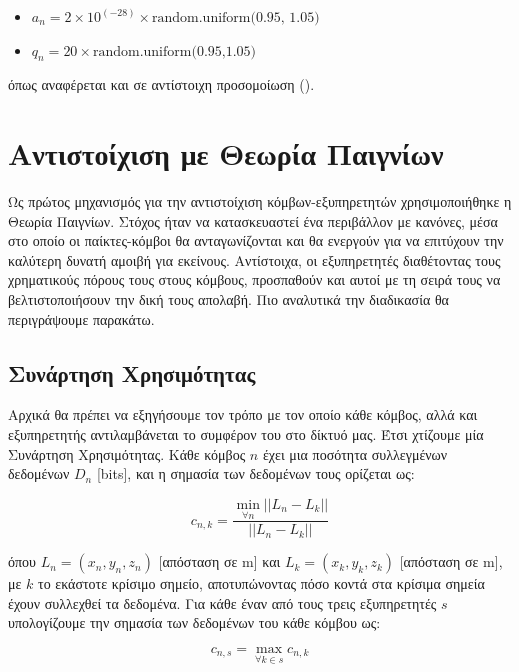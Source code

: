 \begin{itemize}
    \item $a_n = 2 \times 10^{(-28)} \times \text{random.uniform(0.95, 1.05)}$
    \item $q_n = 20 \times \text{random.uniform(0.95,1.05)}$
\end{itemize}

\noindent όπως αναφέρεται και σε αντίστοιχη προσομοίωση ().

\section{Αντιστοίχιση με Θεωρία Παιγνίων}

Ως πρώτος μηχανισμός για την αντιστοίχιση κόμβων-εξυπηρετητών χρησιμοποιήθηκε η Θεωρία Παιγνίων. Στόχος ήταν να κατασκευαστεί ένα περιβάλλον με κανόνες, μέσα στο οποίο οι παίκτες-κόμβοι θα ανταγωνίζονται και θα ενεργούν για να επιτύχουν την καλύτερη δυνατή αμοιβή για εκείνους. Αντίστοιχα, οι εξυπηρετητές διαθέτοντας τους χρηματικούς πόρους τους στους κόμβους, προσπαθούν και αυτοί με τη σειρά τους να βελτιστοποιήσουν την δική τους απολαβή. Πιο αναλυτικά την διαδικασία θα περιγράψουμε παρακάτω.

\subsection{Συνάρτηση Χρησιμότητας}

Αρχικά θα πρέπει να εξηγήσουμε τον τρόπο με τον οποίο κάθε κόμβος, αλλά και εξυπηρετητής αντιλαμβάνεται το συμφέρον του στο δίκτυό μας. Έτσι χτίζουμε μία Συνάρτηση Χρησιμότητας. Κάθε κόμβος $n$ έχει μια ποσότητα συλλεγμένων δεδομένων $D_n$ [bits], και η σημασία των δεδομένων τους ορίζεται ως:

\vspace{-5pt}

\begin{equation}
c_{n,k}=\frac{\min\limits_{\forall n} ||L_n-L_k||}{||L_n-L_k||}
\label{eq1}
\end{equation}

\noindent
όπου $L_n = (x_n,y_n,z_n)$ [απόσταση σε m] και $L_k = (x_k,y_k,z_k)$ [απόσταση σε m], με $k$ το εκάστοτε κρίσιμο σημείο, αποτυπώνοντας πόσο κοντά στα κρίσιμα σημεία έχουν συλλεχθεί τα δεδομένα. Για κάθε έναν από τους τρεις εξυπηρετητές $s$ υπολογίζουμε την σημασία των δεδομένων του κάθε κόμβου ως:

\begin{equation}
c_{n,s}=\max\limits_{\forall k \in s} c_{n,k}
\label{eq2}
\end{equation}

